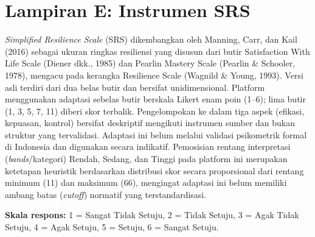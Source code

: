 \section*{Lampiran E: Instrumen SRS}

\textit{Simplified Resilience Scale} (SRS) dikembangkan oleh Manning, Carr, dan Kail (2016) sebagai ukuran ringkas resiliensi yang disusun dari butir Satisfaction With Life Scale (Diener dkk., 1985) dan Pearlin Mastery Scale (Pearlin \& Schooler, 1978), mengacu pada kerangka Resilience Scale (Wagnild \& Young, 1993). Versi asli terdiri dari dua belas butir dan bersifat unidimensional. Platform menggunakan adaptasi sebelas butir berskala Likert enam poin (1--6); lima butir (1, 3, 5, 7, 11) diberi skor terbalik. Pengelompokan ke dalam tiga aspek (efikasi, kepuasan, kontrol) bersifat deskriptif mengikuti instrumen sumber dan bukan struktur yang tervalidasi. Adaptasi ini belum melalui validasi psikometrik formal di Indonesia dan digunakan secara indikatif. Pemosisian rentang interpretasi (\textit{bands}/kategori) Rendah, Sedang, dan Tinggi pada platform ini merupakan ketetapan heuristik berdasarkan distribusi skor secara proporsional dari rentang minimum (11) dan maksimum (66), mengingat adaptasi ini belum memiliki ambang batas (\textit{cutoff}) normatif yang terstandardisasi.

\noindent\textbf{Skala respons:} 1 = Sangat Tidak Setuju, 2 = Tidak Setuju, 3 = Agak Tidak Setuju, 4 = Agak Setuju, 5 = Setuju, 6 = Sangat Setuju.

